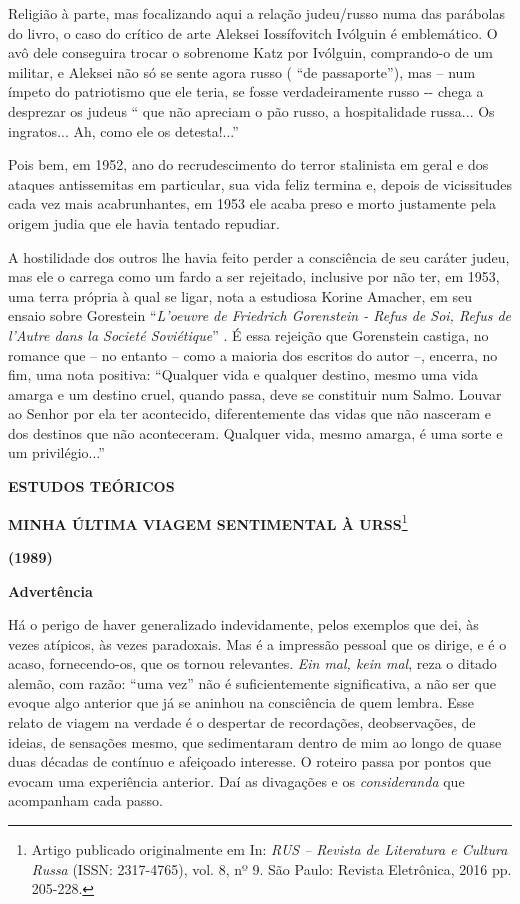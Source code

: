 Religião à parte, mas focalizando aqui a relação judeu/russo numa das
parábolas do livro, o caso do crítico de arte Aleksei Iossífovitch
Ivólguin é emblemático. O avô dele conseguira trocar o sobrenome Katz
por Ivólguin, comprando-o de um militar, e Aleksei não só se sente agora
russo ( ``de passaporte''), mas -- num ímpeto do patriotismo que ele
teria, se fosse verdadeiramente russo -\/- chega a desprezar os judeus
`` que não apreciam o pão russo, a hospitalidade russa... Os ingratos...
Ah, como ele os detesta!...''

Pois bem, em 1952, ano do recrudescimento do terror stalinista em geral
e dos ataques antissemitas em particular, sua vida feliz termina e,
depois de vicissitudes cada vez mais acabrunhantes, em 1953 ele acaba
preso e morto justamente pela origem judia que ele havia tentado
repudiar.

A hostilidade dos outros lhe havia feito perder a consciência de seu
caráter judeu, mas ele o carrega como um fardo a ser rejeitado,
inclusive por não ter, em 1953, uma terra própria à qual se ligar, nota
a estudiosa Korine Amacher, em seu ensaio sobre Gorestein
``\emph{L'oeuvre de Friedrich Gorenstein - Refus de Soi, Refus de
l'Autre dans la Societé Soviétique}'' . É essa rejeição que Gorenstein
castiga, no romance que -- no entanto -- como a maioria dos escritos do
autor --, encerra, no fim, uma nota positiva: ``Qualquer vida e qualquer
destino, mesmo uma vida amarga e um destino cruel, quando passa, deve se
constituir num Salmo. Louvar ao Senhor por ela ter acontecido,
diferentemente das vidas que não nasceram e dos destinos que não
aconteceram. Qualquer vida, mesmo amarga, é uma sorte e um
privilégio...''

\textbf{ESTUDOS TEÓRICOS}

\textbf{MINHA ÚLTIMA VIAGEM SENTIMENTAL À URSS}\footnote{Artigo
  publicado originalmente em In: \emph{RUS -- Revista de Literatura e
  Cultura Russa} (ISSN: 2317-4765), vol. 8, nº 9. São Paulo: Revista
  Eletrônica, 2016 pp. 205-228.}

\textbf{(1989)}

\textbf{Advertência}

Há o perigo de haver generalizado indevidamente, pelos exemplos que dei,
às vezes atípicos, às vezes paradoxais. Mas é a impressão pessoal que os
dirige, e é o acaso, fornecendo-os, que os tornou relevantes. \emph{Ein
mal, kein mal}, reza o ditado alemão, com razão: ``uma vez'' não é
suficientemente significativa, a não ser que evoque algo anterior que já
se aninhou na consciência de quem lembra. Esse relato de viagem na
verdade é o despertar de recordações, deobservações, de ideias, de
sensações mesmo, que sedimentaram dentro de mim ao longo de quase duas
décadas de contínuo e afeiçoado interesse. O roteiro passa por pontos
que evocam uma experiência anterior. Daí as divagações e os
\emph{consideranda} que acompanham cada passo.

